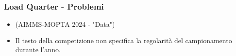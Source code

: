 \documentclass{beamer}
\begin{document}
\begin{frame}
    \frametitle{Load Quarter - Problemi}
    \begin{itemize}
        \item {} (AIMMS-MOPTA 2024 - "Data")
        \item Il testo della competizione non specifica la regolarità del campionamento durante l'anno.
    \end{itemize}
    \vspace{0.5cm}
    \vfill
    \begin{overlayarea}{\textwidth}{\textheight}
        \vfill
        \centering
    \end{overlayarea}
\end{frame}
\end{document}

